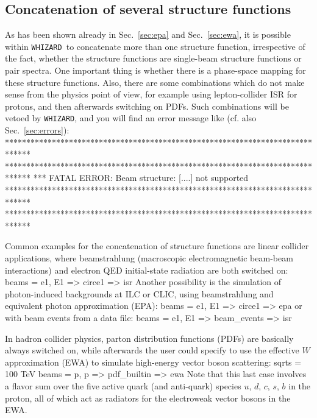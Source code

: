 \documentclass[12pt]{book}
\newenvironment{interaction}%
  {\begingroup\small
   \Verbatim}%
  {\endVerbatim
   \endgroup\noindent}
\newenvironment{code}%
  {\begingroup\footnotesize
   \quote
   \Verbatim}%
  {\endVerbatim
   \endquote
   \endgroup\noindent}
\newcommand{\ttt}[1]{\texttt{#1}}
\newcommand{\whizard}{\ttt{WHIZARD}}
\begin{document}

\subsection{Concatenation of several structure functions}
\label{sec:concatenation}

As has been shown already in Sec.~\ref{sec:epa} and
Sec.~\ref{sec:ewa}, it is possible within \whizard\ to concatenate
more than one structure function, irrespective of the fact, whether
the structure functions are single-beam structure functions or pair
spectra. One important thing is whether there is a phase-space mapping
for these structure functions. Also, there are some combinations which
do not make sense from the physics point of view, for example using
lepton-collider ISR for protons, and then afterwards switching on
PDFs. Such combinations will be vetoed by \whizard, and you will find
an error message like (cf. also Sec.~\ref{sec:errors}):
\begin{interaction}
******************************************************************************
******************************************************************************
*** FATAL ERROR: Beam structure: [....] not supported
******************************************************************************
******************************************************************************
\end{interaction}

Common examples for the concatenation of structure functions are
linear collider applications, where beamstrahlung (macroscopic
electromagnetic beam-beam interactions) and electron QED initial-state
radiation are both switched on:
\begin{code}
beams = e1, E1 => circe1 => isr
\end{code}
Another possibility is the simulation of photon-induced backgrounds at
ILC or CLIC, using beamstrahlung and equivalent photon approximation
(EPA):
\begin{code}
beams = e1, E1 => circe1 => epa
\end{code}
or with beam events from a data file:
\begin{code}
beams = e1, E1 => beam_events => isr
\end{code}

In hadron collider physics, parton distribution functions (PDFs) are
basically always switched on, while afterwards the user could specify
to use the effective $W$ approximation (EWA) to simulate high-energy
vector boson scattering:
\begin{code}
sqrts = 100 TeV
beams = p, p => pdf_builtin => ewa
\end{code}
Note that this last case involves a flavor sum over the five active
quark (and anti-quark) species $u$, $d$, $c$, $s$, $b$ in the proton,
all of which act as radiators for the electroweak vector bosons in the
EWA.
\end{document}
